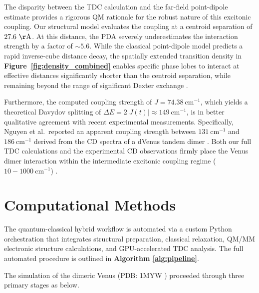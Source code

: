 \documentclass[journal=jpclcd, manuscript=letter, layout=twocolumn, doi=true]{achemso}
\begin{document}
The disparity between the TDC calculation and the far-field point-dipole estimate provides a rigorous QM rationale for the robust nature of this excitonic coupling. Our structural model evaluates the coupling at a centroid separation of $27.6~\mathrm{\AA}$. At this distance, the PDA severely underestimates the interaction strength by a factor of $\sim 5.6$. While the classical point-dipole model predicts a rapid inverse-cube distance decay, the spatially extended transition density in \textbf{Figure~\ref{fig:density_combined}} enables specific phase lobes to interact at effective distances significantly shorter than the centroid separation, while remaining beyond the range of significant Dexter exchange \cite{skourtis2016dexter}.

Furthermore, the computed coupling strength of $J=74.38~\mathrm{cm^{-1}}$, which yields a theoretical Davydov splitting of $\Delta E = 2|J(t)| \approx 149~\mathrm{cm^{-1}}$, is in better qualitative agreement with recent experimental measurements. Specifically, Nguyen et al.\ reported an apparent coupling strength between $131~\mathrm{cm^{-1}}$ and $186~\mathrm{cm^{-1}}$ derived from the CD spectra of a dVenus tandem dimer \cite{nguyen2025anomalous}. Both our full TDC calculations and the experimental CD observations firmly place the Venus dimer interaction within the intermediate excitonic coupling regime ($10 - 1000~\mathrm{cm^{-1}}$) \cite{nguyen2025anomalous, kim2019venusa206}.

\section{Computational Methods}

The quantum-classical hybrid workflow is automated via a custom Python orchestration that integrates structural preparation, classical relaxation, QM/MM electronic structure calculations, and GPU-accelerated TDC analysis. The full automated procedure is outlined in \textbf{Algorithm \ref{alg:pipeline}}.

The simulation of the dimeric Venus (PDB: 1MYW \cite{berman2000protein}) proceeded through three primary stages as below.
\end{document}
